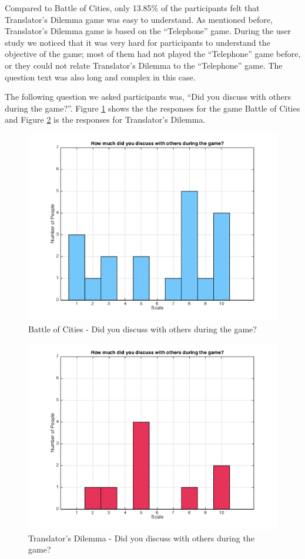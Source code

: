 \documentclass{sig-alternate}
\begin{document}
Compared to Battle of Cities, only 13.85\% of the participants felt that Translator's Dilemma game was easy to understand. As mentioned before, Translator's Dilemma game is based on the ``Telephone'' game. During the user study we noticed that it was very hard for participants to understand the objective of the game; most of them had not played the ``Telephone'' game before, or they could not relate Translator's Dilemma to the ``Telephone'' game. The question text was also long and complex in this case. 

The following question we asked participants was, ``Did you discuss with others during the game?''. Figure \ref{fig:p_discuss} shows the the responses for the game Battle of Cities and Figure \ref{fig:t_discuss} is the responses for Translator's Dilemma.

\begin{figure}
	\includegraphics[width=\linewidth]{p_discuss.png}
	\caption{Battle of Cities - Did you discuss with others during the game?}
	\label{fig:p_discuss}
\end{figure}

\begin{figure}
	\includegraphics[width=\linewidth]{t_discuss.png}
	\caption{Translator's Dilemma - Did you discuss with others during the game?}
	\label{fig:t_discuss}
\end{figure}
\end{document}
